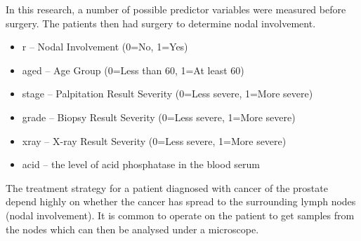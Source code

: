 \documentclass{article}\usepackage[]{graphicx}\usepackage[]{color}
\begin{document}
\begin{enumerate}
In this research, a number of possible predictor variables were measured before surgery. The patients then 
had surgery to determine nodal involvement. 
  \begin{itemize}
    \item r -- Nodal Involvement (0=No, 1=Yes)
    \item aged	-- Age Group (0=Less than 60, 1=At least 60)
    \item stage -- Palpitation Result Severity (0=Less severe, 1=More severe)
    \item grade -- Biopsy Result Severity (0=Less severe, 1=More severe)
    \item xray -- X-ray Result Severity (0=Less severe, 1=More severe)
    \item acid -- the level of acid phosphatase in the blood serum
\end{itemize}
The treatment strategy for a patient diagnosed with cancer of the prostate depend highly on whether the cancer has spread to the surrounding lymph nodes (nodal involvement). It is common to operate on the patient to get samples from the nodes which can then be analysed under a microscope.


\end{enumerate}
\end{document}
